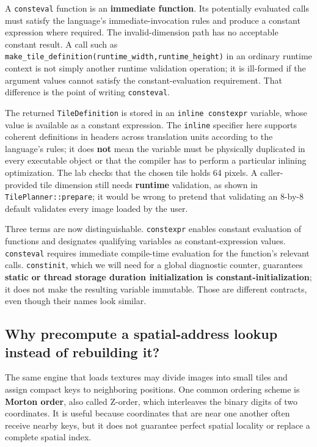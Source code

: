 A \texttt{consteval} function is an \textbf{immediate function}. Its potentially evaluated calls must satisfy the language's immediate-invocation rules and produce a constant expression where required. The invalid-dimension path has no acceptable constant result. A call such as \texttt{make\_tile\_definition(runtime\_width,runtime\_height)} in an ordinary runtime context is not simply another runtime validation operation; it is ill-formed if the argument values cannot satisfy the constant-evaluation requirement. That difference is the point of writing \texttt{consteval}.

The returned \texttt{TileDefinition} is stored in an \texttt{inline\ constexpr} variable, whose value is available as a constant expression. The \texttt{inline} specifier here supports coherent definitions in headers across translation units according to the language's rules; it does \textbf{not} mean the variable must be physically duplicated in every executable object or that the compiler has to perform a particular inlining optimization. The lab checks that the chosen tile holds 64 pixels. A caller-provided tile dimension still needs \textbf{runtime} validation, as shown in \texttt{TilePlanner::prepare}; it would be wrong to pretend that validating an 8-by-8 default validates every image loaded by the user.

Three terms are now distinguishable. \texttt{constexpr} enables constant evaluation of functions and designates qualifying variables as constant-expression values. \texttt{consteval} requires immediate compile-time evaluation for the function's relevant calls. \texttt{constinit}, which we will need for a global diagnostic counter, guarantees \textbf{static or thread storage duration initialization is constant-initialization}; it does not make the resulting variable immutable. Those are different contracts, even though their names look similar.

\subsection{Why precompute a spatial-address lookup instead of rebuilding it?}\label{01-foundations-i-ch005-why-precompute-a-spatial-address-lookup-instead-of-rebuilding-it}

The same engine that loads textures may divide images into small tiles and assign compact keys to neighboring positions. One common ordering scheme is \textbf{Morton order}, also called Z-order, which interleaves the binary digits of two coordinates. It is useful because coordinates that are near one another often receive nearby keys, but it does not guarantee perfect spatial locality or replace a complete spatial index.

